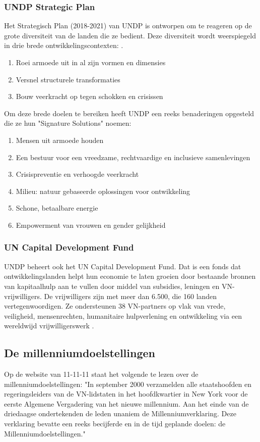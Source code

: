 \subsubsection{UNDP Strategic Plan}
Het Strategisch Plan (2018-2021) van UNDP is ontworpen om te reageren op de grote diversiteit van de landen die ze bedient. Deze diversiteit wordt weerspiegeld in drie brede ontwikkelingscontexten: \autocite{DevelopmentProgram2020}.

\begin{enumerate}
\item Roei armoede uit in al zijn vormen en dimensies
\item Versnel structurele transformaties
\item Bouw veerkracht op tegen schokken en crisissen
\end{enumerate}

Om deze brede doelen te bereiken heeft UNDP een reeks benaderingen opgesteld die ze hun "Signature Solutions" noemen:

\begin{enumerate}
	\item Mensen uit armoede houden
	\item Een bestuur voor een vreedzame, rechtvaardige en inclusieve samenlevingen
	\item Crisispreventie en verhoogde veerkracht
	\item Milieu: natuur gebaseerde oplossingen voor ontwikkeling
	\item Schone, betaalbare energie
	\item Empowerment van vrouwen en gender gelijkheid
\end{enumerate}

\subsubsection{UN Capital Development Fund}
UNDP beheert ook het UN Capital Development Fund. Dat is een fonds dat ontwikkelingslanden helpt hun economie te laten groeien door bestaande bronnen van kapitaalhulp aan te vullen door middel van subsidies, leningen en VN-vrijwilligers. De vrijwilligers zijn met meer dan 6.500, die 160 landen vertegenwoordigen. Ze ondersteunen 38 VN-partners op vlak van vrede, veiligheid, mensenrechten, humanitaire hulpverlening en ontwikkeling via een wereldwijd vrijwilligerswerk \autocite{DevelopmentProgram2020}.

\subsection{De millenniumdoelstellingen}
Op de website van 11-11-11 staat het volgende te lezen over de millenniumdoelstellingen: "In september 2000 verzamelden alle staatshoofden en regeringsleiders van de VN-lidstaten in het hoofdkwartier in New York voor de eerste Algemene Vergadering van het nieuwe millennium. Aan het einde van de driedaagse ondertekenden de leden unaniem de Millenniumverklaring. Deze verklaring bevatte een reeks becijferde en in de tijd geplande doelen: de Millenniumdoelstellingen." \autocite{11.11.112019}

